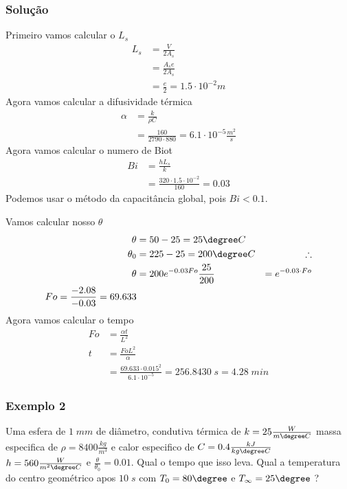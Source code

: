 \subsubsection{Solução}
Primeiro vamos calcular o \(L_{s} \) 
\begin{align}
    L_{s} &= \frac{V}{2A_{s} }\\
    &= \frac{A_{s} e}{2A_{s} }\\
    &= \frac{e}{2} = 1.5 \cdot 10^{-2} m
\end{align}
Agora vamos calcular a difusividade térmica
\begin{align}
    \alpha &= \frac{k}{\rho  C}\\
    &= \frac{160}{2790 \cdot 880} = 6.1 \cdot 10^{-5} \frac{m^{2} }{s}
\end{align}
Agora vamos calcular o numero de Biot
\begin{align}
    Bi &= \frac{h L_{s} }{k}\\
    &= \frac{320 \cdot 1.5 \cdot 10^{-2} }{160} = 0.03
\end{align}
Podemos usar o método da capacitância global, pois \(Bi < 0.1\). \par
Vamos calcular nosso \(\theta \) 
\begin{align}
    \theta &= 50 - 25 = 25 \degree C\\
    \theta_{0} &= 225 - 25 = 200 \degree C
    &\therefore\\
    \theta &= 200 e^{-0.03 Fo}
    \frac{25}{200} &= e^{-0.03 \cdot Fo} \\
    Fo = \frac{-2.08}{-0.03} = 69.633
\end{align}
Agora vamos calcular o tempo
\begin{align}
    Fo &= \frac{\alpha t}{L^{2} } \\
    t &= \frac{Fo L^{2} }{\alpha} \\
    &= \frac{69.633 \cdot 0.015^{2} }{6.1 \cdot 10^{-5} } = 256.8430 \; s = 4.28 \; min 
\end{align}
\subsubsection{Exemplo 2}
Uma esfera de \(1 \; mm\) de diâmetro, condutiva térmica de \(k = 25 \frac{W}{m \degree C}\) massa
especifica de \(\rho  = 8400 \frac{kg}{m^{3} }\) e calor especifico de \(C = 0.4 \frac{kJ}{kg \degree
C}\) \(h = 560 \frac{W}{m^{2} \degree C}\) e \(\frac{\theta}{\theta_0} = 0.01\). Qual o tempo que
isso leva. Qual a temperatura do centro geométrico apos \(10 \; s\) com \(T_0 = 80\degree\) e
\(T_\infty = 25\degree\)  ? \par
